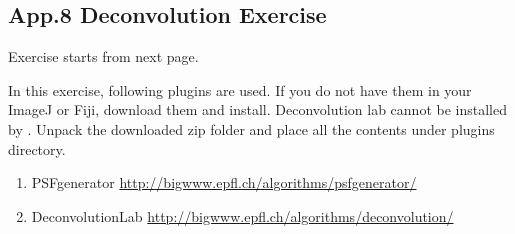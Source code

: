 
\clearpage

\subsection{App.8 Deconvolution Exercise}
\label{app4}

Exercise starts from next page. 

In this exercise, following plugins are used. If you do not have them in your
ImageJ or Fiji, download them and install. Deconvolution lab cannot be installed
by . Unpack the downloaded zip folder and place all
the contents under plugins directory.

\begin{enumerate}
	\item PSFgenerator \url{http://bigwww.epfl.ch/algorithms/psfgenerator/}
	\item DeconvolutionLab \url{http://bigwww.epfl.ch/algorithms/deconvolution/}
\end{enumerate}



\clearpage
